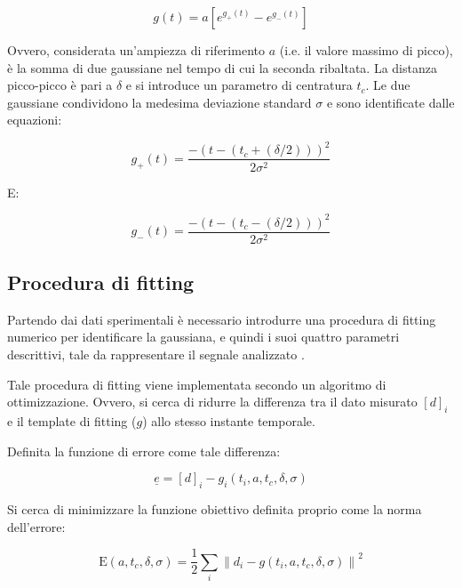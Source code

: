 \begin{equation}
	g(t)=a\left[e^{g_{+}(t)}-e^{g_{-}(t)}\right]
	\label{eq:gaussianabipolare}
\end{equation}

Ovvero, considerata un'ampiezza di riferimento $a$ (i.e. il valore massimo di picco), è la somma di due gaussiane nel tempo di cui la seconda ribaltata. La distanza picco-picco è pari a $\delta$ e si introduce un parametro di centratura $t_c$. Le due gaussiane condividono la medesima deviazione standard $\sigma$ e sono identificate dalle equazioni:

\begin{equation}
	g_{+}(t)=\frac{-\left(t-\left(t_{c} +(\delta / 2)\right)\right)^{2}}{2 \sigma^{2}}
\end{equation}

E:

\begin{equation}
	g_{-}(t)=\frac{-\left(t-\left(t_{c} -(\delta / 2)\right)\right)^{2}}{2 \sigma^{2}}
\end{equation} 

\subsection{Procedura di fitting}

Partendo dai dati sperimentali è necessario introdurre una procedura di fitting numerico per identificare la gaussiana, e quindi i suoi quattro parametri descrittivi, tale da rappresentare il segnale analizzato \cite{caselli_simple_2016}.

Tale procedura di fitting viene implementata secondo un algoritmo di ottimizzazione. Ovvero, si cerca di ridurre la differenza tra il dato misurato $[d]_i$ e il template di fitting ($g$) allo stesso instante temporale. 

Definita la funzione di errore come tale differenza:

\begin{equation}
	\underline{e}=[d]_{i}-g_{i}\left(t_{i}, a,t_c,\delta,\sigma\right)
\end{equation}

Si cerca di minimizzare la funzione obiettivo definita proprio come la norma dell'errore:

\begin{equation}
	\mathrm{E}(a,t_c,\delta,\sigma) = \frac{1}{2} \sum_{i}\left\|d_{i}-g\left(t_{i},a,t_c,\delta,\sigma\right)\right\|^{2}
\end{equation}


